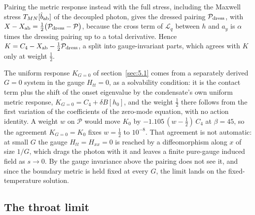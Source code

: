 Pairing the metric response instead with the full stress, including the
Maxwell stress $T_{MN}[\hat b_{\rm ab}]$ of the decoupled photon, gives the
dressed pairing $\mathcal{P}_{\rm dress}$, with
$X - X_{\rm ab} = \tfrac12\big(\mathcal{P}_{\rm dress} - \mathcal{P}\big)$,
because the cross term of $\mathcal{L}_q$ between $h$ and $a_y$ is $\alpha$
times the dressing pairing up to a total derivative. Hence
$K = C_4 - X_{\rm ab} - \tfrac12\mathcal{P}_{\rm dress}$, a split into
gauge-invariant parts, which agrees with $K$ only at weight $\tfrac12$.

The uniform response $K_{G=0}$ of section~\ref{sec:5.1} comes from a
separately derived $G = 0$ system in the gauge $H_{tt} = 0$, as a
solvability condition: it is the contact term plus the shift of the onset
eigenvalue by the condensate's own uniform metric response,
$K_{G=0} = C_4 + \delta B[h_0]$, and the weight $\tfrac12$ there follows
from the first variation of the coefficients of the zero-mode equation,
with no action identity. A weight $w$ on $\mathcal{P}$ would move $K_0$ by
$-1.105\,(w - \tfrac12)\,C_4$ at $\beta = 45$, so the agreement
$K_{G=0} = K_0$ fixes $w = \tfrac12$ to $10^{-8}$. That
agreement is not automatic: at small $G$ the gauge $H_{tt} = H_{xx} = 0$
is reached by a diffeomorphism along $x$ of size $1/G$, which drags the
photon with it and leaves a finite pure-gauge induced field as $s \to 0$.
By the gauge invariance above the pairing does not see it, and since the
boundary metric is held fixed at every $G$, the limit lands on the
fixed-temperature solution.

\subsection{The throat limit}
\label{app:response-throat}

